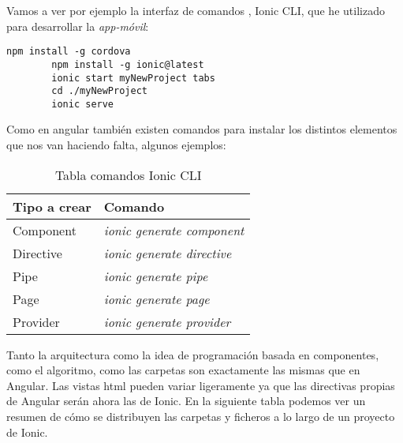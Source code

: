 Vamos a ver por ejemplo la interfaz de comandos \cite{ionicli}, Ionic CLI,  que he utilizado para desarrollar la \emph{app-móvil}: 

	\lstset{language=C, breaklines=true, basicstyle=\footnotesize}
		\begin{lstlisting}[frame=single] 
		npm install -g cordova
		npm install -g ionic@latest
		ionic start myNewProject tabs
		cd ./myNewProject
		ionic serve
    	\end{lstlisting}	 
    	
 Como en angular también existen comandos para instalar los distintos elementos que nos van haciendo falta, algunos ejemplos:
 
 \begin{table}[H]
\begin{center}
\begin{tabular}{|l|l|}
\hline
Tipo a crear & Comando  \\
\hline \hline
Component & \emph{ionic generate component}  \\ \hline
Directive & \emph{ionic generate directive}  \\ \hline
Pipe & \emph{ionic generate pipe}  \\ \hline
Page & \emph{ionic generate page}  \\ \hline
Provider & \emph{ionic generate provider}  \\ \hline
\end{tabular}
\caption{Tabla comandos Ionic CLI}
\end{center}
\end{table}   	


Tanto la arquitectura como la idea de programación basada en componentes, como el algoritmo, como las carpetas son exactamente las mismas que en Angular. Las vistas html pueden variar ligeramente ya que las directivas propias de Angular serán ahora las de Ionic.  En la siguiente tabla podemos ver un resumen de cómo se distribuyen las carpetas y ficheros a lo largo de un proyecto de Ionic.

